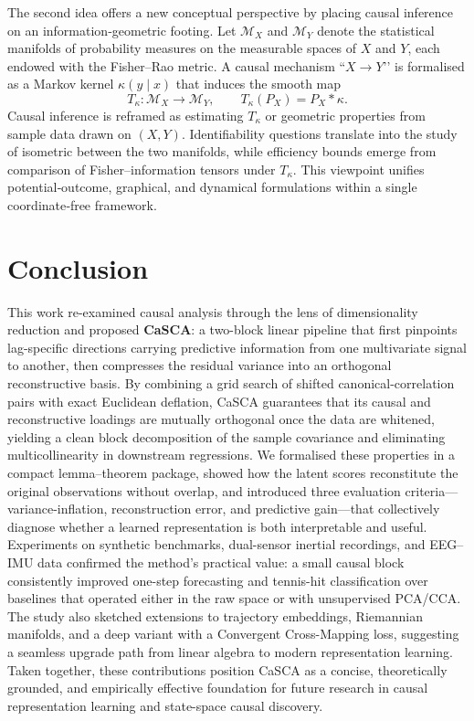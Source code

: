 \documentclass[14pt]{extarticle}
\begin{document}
	The second idea offers a new conceptual perspective by placing causal inference on an information‑geometric footing.  
	Let $\mathcal M_X$ and $\mathcal M_Y$ denote the statistical manifolds of probability measures on the measurable spaces of $X$ and $Y$, each endowed with the Fisher–Rao metric.  
	A causal mechanism “$X\!\rightarrow\!Y$’’ is formalised as a Markov kernel $\kappa(y\!\mid\!x)$ that induces the smooth map
	$$
	T_\kappa:\mathcal M_X\longrightarrow\mathcal M_Y,\qquad T_\kappa(P_X)=P_X\ast\kappa.
	$$
	Causal inference is reframed as estimating $T_\kappa$ or geometric properties from sample data drawn on $(X,Y)$.  
	Identifiability questions translate into the study of isometric between the two manifolds, while efficiency bounds emerge from comparison of Fisher–information tensors under $T_\kappa$.  
	This viewpoint unifies potential‑outcome, graphical, and dynamical formulations within a single coordinate‑free framework.  
	
	\section{Conclusion} \label{sec:conclusion}
	
	This work re-examined causal analysis through the lens of dimensionality reduction and proposed \textbf{CaSCA}: a two-block linear pipeline that first pinpoints lag-specific directions carrying predictive information from one multivariate signal to another, then compresses the residual variance into an orthogonal reconstructive basis.  
	By combining a grid search of shifted canonical-correlation pairs with exact Euclidean deflation, CaSCA guarantees that its causal and reconstructive loadings are mutually orthogonal once the data are whitened, yielding a clean block decomposition of the sample covariance and eliminating multicollinearity in downstream regressions.  
	We formalised these properties in a compact lemma–theorem package, showed how the latent scores reconstitute the original observations without overlap, and introduced three evaluation criteria—variance-inflation, reconstruction error, and predictive gain—that collectively diagnose whether a learned representation is both interpretable and useful.  
	Experiments on synthetic benchmarks, dual-sensor inertial recordings, and EEG–IMU data confirmed the method’s practical value: a small causal block consistently improved one-step forecasting and tennis-hit classification over baselines that operated either in the raw space or with unsupervised PCA/CCA.  
	The study also sketched extensions to trajectory embeddings, Riemannian manifolds, and a deep variant with a Convergent Cross-Mapping loss, suggesting a seamless upgrade path from linear algebra to modern representation learning.  
	Taken together, these contributions position CaSCA as a concise, theoretically grounded, and empirically effective foundation for future research in causal representation learning and state-space causal discovery.
	
	
	
	
	
\end{document}
